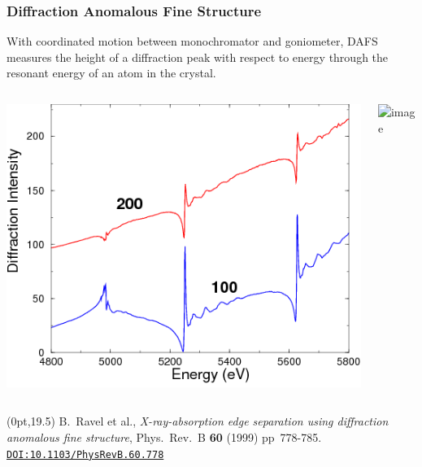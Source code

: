 \documentclass[10pt, xcolor=x11names, compress]{beamer}
\begin{document}
\begin{frame}
  \frametitle{Diffraction Anomalous Fine Structure}

  With coordinated motion between monochromator and goniometer, DAFS
  measures the height of a diffraction peak with respect to energy
  through the resonant energy of an atom in the crystal.
  \begin{columns}[T]
    \begin{column}{0.5\linewidth}
      \includegraphics[width=0.85\linewidth]{images/dafs.png}
    \end{column}
    \begin{column}{0.5\linewidth}
      \includegraphics<2>[width=0.8\linewidth]{images/dafschik.png}      
    \end{column}
  \end{columns}
  \begin{overlayarea}{\linewidth}{6ex}
  \end{overlayarea}

  \begin{textblock*}{0.6\linewidth}(0pt,19.5\TPVertModule)%
    \tiny%
    B.\ Ravel et al., \textit{X-ray-absorption edge separation using
      diffraction anomalous fine structure}, Phys.\ Rev.\ B \textbf{60}
    (1999) pp\ 778-785.
    \href{http://dx.doi.org/10.1103/PhysRevB.60.778}
    {\color{Blue4}\texttt{DOI:10.1103/PhysRevB.60.778}}
  \end{textblock*}
\end{frame}
\end{document}
